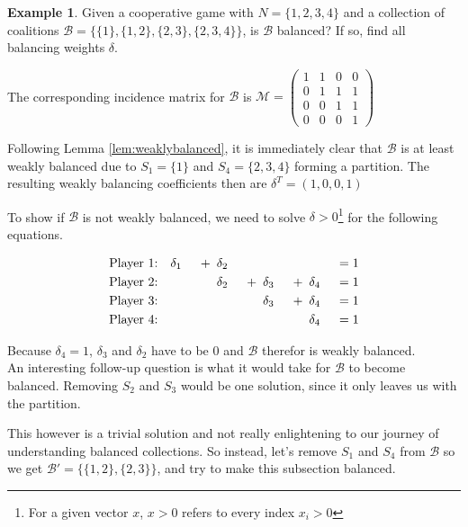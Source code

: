 \documentclass[10pt,a4paper,titlepage]{article}
\theoremstyle{plain}
\theoremstyle{definition}
\newtheorem{example}[thm]{Example} %
\begin{document}
\begin{example}\label{ex:isbalanced1}
    Given a cooperative game with $N = \{1, 2, 3, 4\}$ and a collection of coalitions $\mathcal{B} = \{\{1\}, \{1, 2\}, \{2, 3\}, \{2, 3, 4\}\}$, is $\mathcal{B}$ balanced? If so, find all balancing weights $\delta$.

    The corresponding incidence matrix for $\mathcal{B}$ is $\mathcal{M} = \begin{pmatrix}
        1 & 1 & 0 & 0\\
        0 & 1 & 1 & 1\\
        0 & 0 & 1 & 1\\
        0 & 0 & 0 & 1
    \end{pmatrix}$

    Following Lemma \ref{lem:weaklybalanced}, it is immediately clear that $\mathcal{B}$ is at least weakly balanced due to $S_1 = \{1\}$ and $S_4 = \{2, 3, 4\}$ forming a partition. The resulting weakly balancing coefficients then are $\delta^T = (1, 0, 0, 1)$

    To show if $\mathcal{B}$ is not weakly balanced, we need to solve $\delta > 0$\footnote{For a given vector $x$, $x > 0$ refers to every index $x_i > 0$} for the following equations.\vspace{-15pt}

    \begin{alignat*}{8}
        \text{Player 1:} \quad & \delta_1 &\enskip + \enskip &\delta_2 & & & & &\enskip = 1\\
        \text{Player 2:} \quad & & &\delta_2 &\enskip + \enskip &\delta_3 &\enskip + \enskip&\delta_4 &\enskip = 1\\
        \text{Player 3:} \quad & & & & &\delta_3 &\enskip + \enskip&\delta_4 &\enskip = 1\\
        \text{Player 4:} \quad & & & & & & &\delta_4 &\enskip = 1
    \end{alignat*}

    Because $\delta_4 = 1$, $\delta_3$ and $\delta_2$ have to be 0 and $\mathcal{B}$ therefor is weakly balanced.\\

    An interesting follow-up question is what it would take for $\mathcal{B}$ to become balanced. Removing $S_2$ and $S_3$ would be one solution, since it only leaves us with the partition.
    
    This however is a trivial solution and not really enlightening to our journey of understanding balanced collections. So instead, let's remove $S_1$ and $S_4$ from $\mathcal{B}$ so we get $\mathcal{B}' = \{\{1, 2\}, \{2, 3\}\}$, and try to make this subsection balanced.


\end{example}
\end{document}
